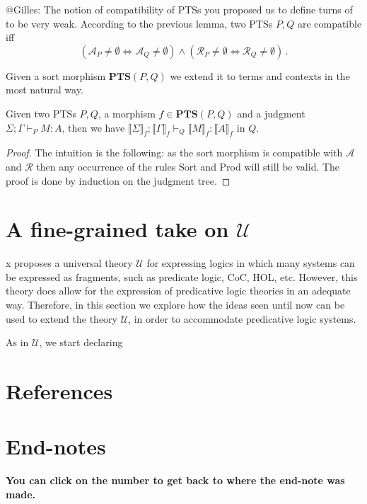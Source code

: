 \documentclass[]{template}
\begin{document}
@Gilles: The notion of compatibility of PTSs you proposed us to define turns of to be very weak. According to the previous lemma, two PTSs $ P, Q $ are compatible iff \[
  (\mathcal{A}_P \neq \emptyset \iff \mathcal{A}_Q \neq \emptyset) \land   (\mathcal{R}_P \neq \emptyset \iff \mathcal{R}_Q \neq \emptyset) 
  \,.\]

Given a sort morphism $ \textbf{PTS}(P, Q) $ we extend it to terms and contexts in the most natural way.

\begin{thm}[]
Given two PTSs $ P, Q $, a morphism $ f \in \textbf{PTS}(P, Q) $ and a judgment $ \Sigma; \Gamma \vdash_P M : A $, then we have $ \llbracket \Sigma \rrbracket_f; \llbracket \Gamma \rrbracket_f \vdash_Q \llbracket M \rrbracket_f : \llbracket A \rrbracket_f $ in $ Q. $
\end{thm}
\begin{proof}
The intuition is the following: as the sort morphism is compatible with $ \mathcal{A} $ and $ \mathcal{R} $ then any occurrence of the rules Sort and Prod will still be valid. The proof is done by induction on the judgment tree.
\end{proof}

\section{A fine-grained take on $ \mathcal{U}$}
\label{sec:fgu}

x proposes a universal theory $ \mathcal{U} $ for expressing logics in which many systems can be expressed as fragments, such as predicate logic, CoC, HOL, etc. However, this theory does allow for the expression of predicative logic theories in an adequate way. Therefore, in this section we explore how the ideas seen until now can be used to extend the theory $ \mathcal{U}$, in order to accommodate predicative logic systems.

As in $ \mathcal{U} $, we start declaring 





\begin{appendices}
  \section{References}
  


\section{End-notes}
\label{sec:foot}
\textbf{You can click on the number to get back to where the end-note was made.}
\printendnotes[custom]

\end{appendices}
\end{document}
